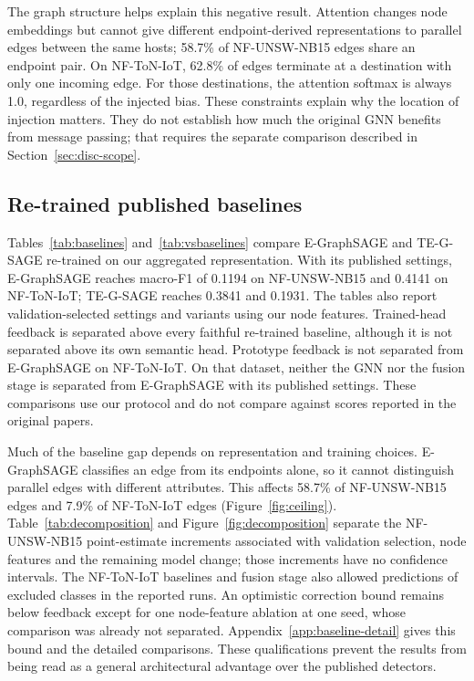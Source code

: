 The graph structure helps explain this negative result. Attention changes node embeddings but cannot give different endpoint-derived representations to parallel edges between the same hosts; 58.7\% of NF-UNSW-NB15 edges share an endpoint pair. On NF-ToN-IoT, 62.8\% of edges terminate at a destination with only one incoming edge. For those destinations, the attention softmax is always 1.0, regardless of the injected bias. These constraints explain why the location of injection matters. They do not establish how much the original GNN benefits from message passing; that requires the separate comparison described in Section~\ref{sec:disc-scope}.



\FloatBarrier
\subsection{Re-trained published baselines}
\label{sec:res-baselines}

Tables~\ref{tab:baselines} and~\ref{tab:vsbaselines} compare E-GraphSAGE and TE-G-SAGE re-trained on our aggregated representation. With its published settings, E-GraphSAGE reaches macro-F1 of 0.1194 on NF-UNSW-NB15 and 0.4141 on NF-ToN-IoT; TE-G-SAGE reaches 0.3841 and 0.1931. The tables also report validation-selected settings and variants using our node features. Trained-head feedback is separated above every faithful re-trained baseline, although it is not separated above its own semantic head. Prototype feedback is not separated from E-GraphSAGE on NF-ToN-IoT. On that dataset, neither the GNN nor the fusion stage is separated from E-GraphSAGE with its published settings. These comparisons use our protocol and do not compare against scores reported in the original papers.

Much of the baseline gap depends on representation and training choices. E-GraphSAGE classifies an edge from its endpoints alone, so it cannot distinguish parallel edges with different attributes. This affects 58.7\% of NF-UNSW-NB15 edges and 7.9\% of NF-ToN-IoT edges (Figure~\ref{fig:ceiling}). Table~\ref{tab:decomposition} and Figure~\ref{fig:decomposition} separate the NF-UNSW-NB15 point-estimate increments associated with validation selection, node features and the remaining model change; those increments have no confidence intervals. The NF-ToN-IoT baselines and fusion stage also allowed predictions of excluded classes in the reported runs. An optimistic correction bound remains below feedback except for one node-feature ablation at one seed, whose comparison was already not separated. Appendix~\ref{app:baseline-detail} gives this bound and the detailed comparisons. These qualifications prevent the results from being read as a general architectural advantage over the published detectors.

